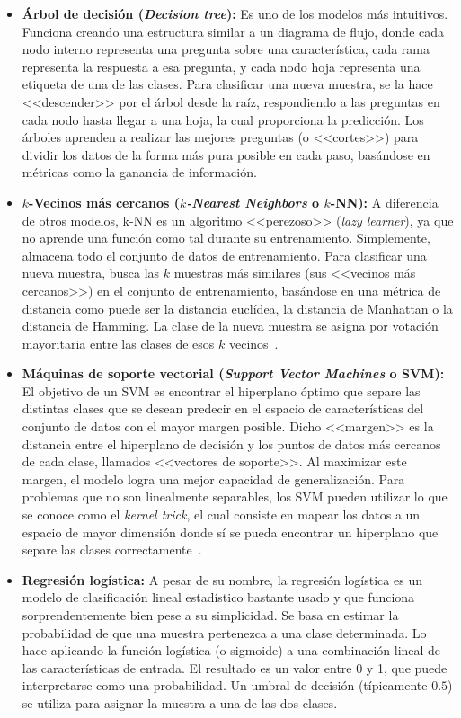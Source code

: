 \begin{itemize}
	\item \textbf{Árbol de decisión (\textit{Decision tree}):} Es uno de los modelos más intuitivos. Funciona creando una estructura similar a un diagrama de flujo, donde cada nodo interno representa una pregunta sobre una característica, cada rama representa la respuesta a esa pregunta, y cada nodo hoja representa una etiqueta de una de las clases. Para clasificar una nueva muestra, se la hace <<descender>> por el árbol desde la raíz, respondiendo a las preguntas en cada nodo hasta llegar a una hoja, la cual proporciona la predicción. Los árboles aprenden a realizar las mejores preguntas (o <<cortes>>) para dividir los datos de la forma más pura posible en cada paso, basándose en métricas como la ganancia de información.~\cite{breiman2017classification}
	
	\item \textbf{$k$-Vecinos más cercanos (\textit{$k$-Nearest Neighbors} o $k$-NN):} A diferencia de otros modelos, k-NN es un algoritmo <<perezoso>> (\textit{lazy learner}), ya que no aprende una función como tal durante su entrenamiento. Simplemente, almacena todo el conjunto de datos de entrenamiento. Para clasificar una nueva muestra, busca las $k$ muestras más similares (sus <<vecinos más cercanos>>) en el conjunto de entrenamiento, basándose en una métrica de distancia como puede ser la distancia euclídea, la distancia de Manhattan o la distancia de Hamming. La clase de la nueva muestra se asigna por votación mayoritaria entre las clases de esos $k$ vecinos~\cite{cover1967nearest}.
	
	\item \textbf{Máquinas de soporte vectorial (\textit{Support Vector Machines} o SVM):} El objetivo de un SVM es encontrar el hiperplano óptimo que separe las distintas clases que se desean predecir en el espacio de características del conjunto de datos con el mayor margen posible. Dicho <<margen>> es la distancia entre el hiperplano de decisión y los puntos de datos más cercanos de cada clase, llamados <<vectores de soporte>>. Al maximizar este margen, el modelo logra una mejor capacidad de generalización. Para problemas que no son linealmente separables, los SVM pueden utilizar lo que se conoce como el \textit{kernel trick}, el cual consiste en mapear los datos a un espacio de mayor dimensión donde sí se pueda encontrar un hiperplano que separe las clases correctamente~\cite{cortes1995support}.

	\item \textbf{Regresión logística:} A pesar de su nombre, la regresión logística es un modelo de clasificación lineal estadístico bastante usado y que funciona sorprendentemente bien pese a su simplicidad. Se basa en estimar la probabilidad de que una muestra pertenezca a una clase determinada. Lo hace aplicando la función logística (o sigmoide) a una combinación lineal de las características de entrada. El resultado es un valor entre 0 y 1, que puede interpretarse como una probabilidad. Un umbral de decisión (típicamente $0.5$) se utiliza para asignar la muestra a una de las dos clases.
\end{itemize}

